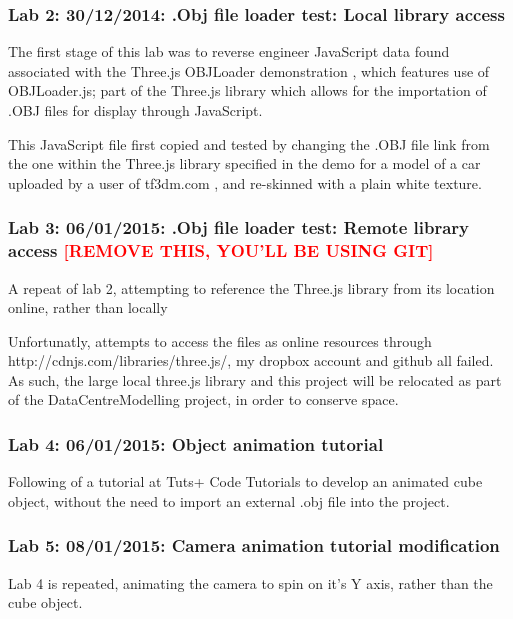 \subsubsection{Lab 2: 30/12/2014: .Obj file loader test: Local library access}
\label{subSubSec:ThreeJSExperiments:Lab2}
The first stage of this lab was to reverse engineer JavaScript data found associated with the Three.js OBJLoader demonstration \cite{ThreeJSObjLoader}, which features use of OBJLoader.js; part of the Three.js library which allows for the importation of .OBJ files for display through JavaScript.

This JavaScript file first copied and tested by changing the .OBJ file link from the one within the Three.js library specified in the demo for a model of a car uploaded by a user of tf3dm.com \cite{LarsenBMWObj}, and re-skinned with a plain white texture.

\subsubsection{Lab 3: 06/01/2015: .Obj file loader test: Remote library access \textcolor{red}{[REMOVE THIS, YOU'LL BE USING GIT]}}
\label{subSubSec:ThreeJSExperiments:Lab3}
A repeat of lab 2, attempting to reference the Three.js library from its location online, rather than locally

Unfortunatly, attempts to access the files as online resources through http://cdnjs.com/libraries/three.js/, my dropbox account and github all failed. As such, the large local three.js library and this project will be relocated as part of the DataCentreModelling project, in order to conserve space.

\subsubsection{Lab 4: 06/01/2015: Object animation tutorial}
\label{subSubSec:ThreeJSExperiments:Lab4}
Following of a tutorial at Tuts+ Code Tutorials \cite{Tuts+ThreeJS} to develop an animated cube object, without the need to import an external .obj file into the project.

\subsubsection{Lab 5: 08/01/2015: Camera animation tutorial modification}
\label{subSubSec:ThreeJSExperiments:Lab5}
Lab 4 is repeated, animating the camera to spin on it's Y axis, rather than the cube object.

